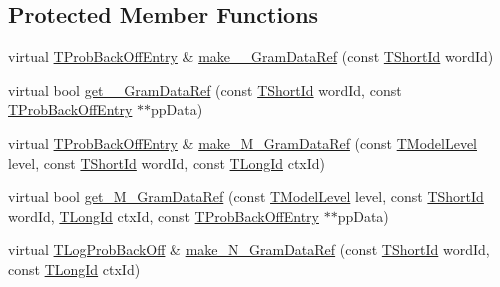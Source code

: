 \subsection*{Protected Member Functions}
\begin{DoxyCompactItemize}
\item 
virtual \hyperlink{structuva_1_1smt_1_1tries_1_1_t_prob_back_off_entry}{T\+Prob\+Back\+Off\+Entry} \& \hyperlink{classuva_1_1smt_1_1tries_1_1_c2_w_array_trie_a6afa3fac844932b3b97c7a5c865e2407}{make\+\_\+\_\+\+Gram\+Data\+Ref} (const \hyperlink{namespaceuva_1_1smt_1_1hashing_adcf22e1982ad09d3a63494c006267469}{T\+Short\+Id} word\+Id)
\item 
virtual bool \hyperlink{classuva_1_1smt_1_1tries_1_1_c2_w_array_trie_a6088b2523123c903d7add3fbd4617653}{get\+\_\+\_\+\+Gram\+Data\+Ref} (const \hyperlink{namespaceuva_1_1smt_1_1hashing_adcf22e1982ad09d3a63494c006267469}{T\+Short\+Id} word\+Id, const \hyperlink{structuva_1_1smt_1_1tries_1_1_t_prob_back_off_entry}{T\+Prob\+Back\+Off\+Entry} $\ast$$\ast$pp\+Data)
\item 
virtual \hyperlink{structuva_1_1smt_1_1tries_1_1_t_prob_back_off_entry}{T\+Prob\+Back\+Off\+Entry} \& \hyperlink{classuva_1_1smt_1_1tries_1_1_c2_w_array_trie_a45a90fdd72eefd36ac42199facf49df1}{make\+\_\+\+M\+\_\+\+Gram\+Data\+Ref} (const \hyperlink{namespaceuva_1_1smt_1_1tries_a20577a44b3a42d26524250634379b7cb}{T\+Model\+Level} level, const \hyperlink{namespaceuva_1_1smt_1_1hashing_adcf22e1982ad09d3a63494c006267469}{T\+Short\+Id} word\+Id, const \hyperlink{namespaceuva_1_1smt_1_1hashing_a5992ac0dea0fb3226fb403ede09fad55}{T\+Long\+Id} ctx\+Id)
\item 
virtual bool \hyperlink{classuva_1_1smt_1_1tries_1_1_c2_w_array_trie_afaa5f8d456c99ac0fa845b96b6e88747}{get\+\_\+\+M\+\_\+\+Gram\+Data\+Ref} (const \hyperlink{namespaceuva_1_1smt_1_1tries_a20577a44b3a42d26524250634379b7cb}{T\+Model\+Level} level, const \hyperlink{namespaceuva_1_1smt_1_1hashing_adcf22e1982ad09d3a63494c006267469}{T\+Short\+Id} word\+Id, \hyperlink{namespaceuva_1_1smt_1_1hashing_a5992ac0dea0fb3226fb403ede09fad55}{T\+Long\+Id} ctx\+Id, const \hyperlink{structuva_1_1smt_1_1tries_1_1_t_prob_back_off_entry}{T\+Prob\+Back\+Off\+Entry} $\ast$$\ast$pp\+Data)
\item 
virtual \hyperlink{namespaceuva_1_1smt_1_1tries_acd0660255dd9ef5d644f01de49102750}{T\+Log\+Prob\+Back\+Off} \& \hyperlink{classuva_1_1smt_1_1tries_1_1_c2_w_array_trie_a89b187a4e019998e527b9a5c10121a2f}{make\+\_\+\+N\+\_\+\+Gram\+Data\+Ref} (const \hyperlink{namespaceuva_1_1smt_1_1hashing_adcf22e1982ad09d3a63494c006267469}{T\+Short\+Id} word\+Id, const \hyperlink{namespaceuva_1_1smt_1_1hashing_a5992ac0dea0fb3226fb403ede09fad55}{T\+Long\+Id} ctx\+Id)

\end{DoxyCompactItemize}
